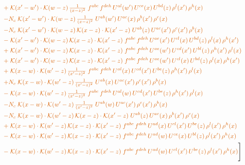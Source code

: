 \documentclass[10pt]{article}
\numberwithin{equation}{section}
\begin{document}
\begin{align}
&\quad{\color{BFK}+\;\mathcal{K}(x'-w')\cdot\mathcal{K}(w-z)\,\tfrac{1}{(x-z)^{2}}\;f^{abc}\,f^{deh}\,U^{al}(w')\,U^{ce}(x)\,U^{bd}(z)\,\rho^{l}(x')\,\rho^{h}(x)}\notag\\
&\quad{\color{BFK}-N_c\;\mathcal{K}(x'-w')\cdot\mathcal{K}(w-z)\,\tfrac{1}{(x-z)^{2}}\;U^{ab}(w')\,U^{ac}(x)\,\rho^{b}(x')\,\rho^{c}(x)}\notag\\
&\quad{\color{BFK}-N_c\;\mathcal{K}(x'-w')\cdot\mathcal{K}(w-z)\,\mathcal{K}(x-z)\cdot\mathcal{K}(x'-z)\;U^{ab}(z)\,U^{ac}(x')\,\rho^{c}(x')\,\rho^{b}(x)}\notag\\
&\quad{\color{BFK}-\;\mathcal{K}(x'-w')\cdot\mathcal{K}(w-z)\,\mathcal{K}(x-z)\cdot\mathcal{K}(x'-z)\;f^{abc}\,f^{deh}\,U^{ae}(x')\,U^{cl}(x)\,U^{bd}(z)\,\rho^{l}(x)\,\rho^{h}(x')}\notag\\
&\quad{\color{BFK}+\;\mathcal{K}(x'-w')\cdot\mathcal{K}(w-z)\,\mathcal{K}(x-z)\cdot\mathcal{K}(x'-z)\;f^{abc}\,f^{deh}\,U^{ae}(w')\,U^{cd}(x')\,U^{bl}(z)\,\rho^{h}(x')\,\rho^{l}(x)}\notag\\
&\quad{\color{BFK}+\;\mathcal{K}(x'-w')\cdot\mathcal{K}(w-z)\,\mathcal{K}(x-z)\cdot\mathcal{K}(x'-z)\;f^{abc}\,f^{deh}\,U^{ae}(w')\,U^{cl}(x)\,U^{bd}(z)\,\rho^{l}(x)\,\rho^{h}(x')}\notag\\
&\quad{\color{BFK}+\;\mathcal{K}(x-w)\cdot\mathcal{K}(w'-z)\,\tfrac{1}{(x'-z)^{2}}\;f^{abc}\,f^{deh}\,U^{al}(x)\,U^{cd}(x')\,U^{be}(z)\,\rho^{h}(x')\,\rho^{l}(x)}\notag\\
&\quad{\color{BFK}+N_c\;\mathcal{K}(x-w)\cdot\mathcal{K}(w'-z)\,\tfrac{1}{(x'-z)^{2}}\;U^{ab}(x)\,U^{ac}(x')\,\rho^{c}(x')\,\rho^{b}(x)}\notag\\
&\quad{\color{BFK}-\;\mathcal{K}(x-w)\cdot\mathcal{K}(w'-z)\,\tfrac{1}{(x'-z)^{2}}\;f^{abc}\,f^{deh}\,U^{al}(w)\,U^{cd}(x')\,U^{be}(z)\,\rho^{h}(x')\,\rho^{l}(x)}\notag\\
&\quad{\color{BFK}-N_c\;\mathcal{K}(x-w)\cdot\mathcal{K}(w'-z)\,\tfrac{1}{(x'-z)^{2}}\;U^{ab}(w)\,U^{ac}(x')\,\rho^{c}(x')\,\rho^{b}(x)}\notag\\
&\quad{\color{BFK}-N_c\;\mathcal{K}(x-w)\cdot\mathcal{K}(w'-z)\,\mathcal{K}(x-z)\cdot\mathcal{K}(x'-z)\;U^{ab}(z)\,U^{ac}(x)\,\rho^{b}(x')\,\rho^{c}(x)}\notag\\
&\quad{\color{BFK}+\;\mathcal{K}(x-w)\cdot\mathcal{K}(w'-z)\,\mathcal{K}(x-z)\cdot\mathcal{K}(x'-z)\;f^{abc}\,f^{deh}\,U^{ad}(x)\,U^{cl}(x')\,U^{be}(z)\,\rho^{l}(x')\,\rho^{h}(x)}\notag\\
&\quad{\color{BFK}-\;\mathcal{K}(x-w)\cdot\mathcal{K}(w'-z)\,\mathcal{K}(x-z)\cdot\mathcal{K}(x'-z)\;f^{abc}\,f^{deh}\,U^{ad}(w)\,U^{ce}(x)\,U^{bl}(z)\,\rho^{l}(x')\,\rho^{h}(x)}\notag\\
&\quad{\color{BFK}-\;\mathcal{K}(x-w)\cdot\mathcal{K}(w'-z)\,\mathcal{K}(x-z)\cdot\mathcal{K}(x'-z)\;f^{abc}\,f^{deh}\,U^{ad}(w)\,U^{cl}(x')\,U^{be}(z)\,\rho^{l}(x')\,\rho^{h}(x)}\Bigg]\label{eq:P1}
\end{align}
\end{document}
